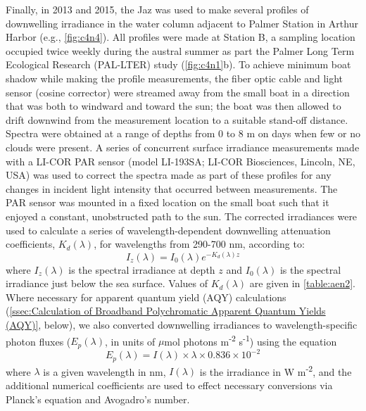 Finally, in 2013 and 2015, the Jaz was used to make several profiles of downwelling irradiance in the water column adjacent to Palmer Station in Arthur Harbor (e.g., \autoref{fig:c4n4}). All profiles were made at Station B, a sampling location occupied twice weekly during the austral summer as part the Palmer Long Term Ecological Research (PAL-LTER) study (\autoref{fig:c4n1}b). To achieve minimum boat shadow while making the profile measurements, the fiber optic cable and light sensor (cosine corrector) were streamed away from the small boat in a direction that was both to windward and toward the sun; the boat was then allowed to drift downwind from the measurement location to a suitable stand-off distance. Spectra were obtained at a range of depths from 0 to 8 m on days when few or no clouds were present. A series of concurrent surface irradiance measurements made with a LI-COR PAR sensor (model LI-193SA; LI-COR Biosciences, Lincoln, NE, USA) was used to correct the spectra made as part of these profiles for any changes in incident light intensity that occurred between measurements. The PAR sensor was mounted in a fixed location on the small boat such that it enjoyed a constant, unobstructed path to the sun. The corrected irradiances were used to calculate a series of wavelength-dependent downwelling attenuation coefficients, ${K_d}(\lambda )$, for wavelengths from 290-700 nm, according to:
\begin{equation} \label{eq:c4e1}
{I_z}(\lambda ) = {I_0}(\lambda ){e^{ - {K_d}(\lambda )z}}
\end{equation}
where ${I_z}(\lambda )$ is the spectral irradiance at depth $z$ and ${I_0}(\lambda )$ is the spectral irradiance just below the sea surface. Values of ${K_d}(\lambda )$ are given in \autoref{table:aen2}. Where necessary for apparent quantum yield (AQY) calculations (\autoref{ssec:Calculation of Broadband Polychromatic Apparent Quantum Yields (AQY)}, below), we also converted downwelling irradiances to wavelength-specific photon fluxes (${E_p}(\lambda )$, in units of $\mu$mol photons m\textsuperscript{-2} s\textsuperscript{-1}) using the equation
\begin{equation} \label{eq:c4e2}
{E_p}(\lambda ) = I(\lambda ) \times \lambda  \times 0.836 \times {10^{ - 2}}
\end{equation}
where $\lambda$ is a given wavelength in nm, ${I}(\lambda )$ is the irradiance in W m\textsuperscript{-2}, and the additional numerical coefficients are used to effect necessary conversions via Planck's equation and Avogadro's number.

